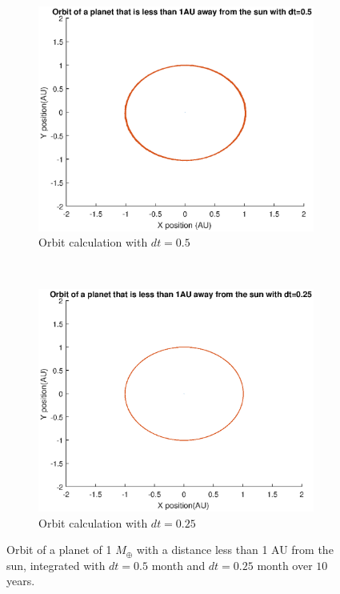 \begin{figure}[H]
	\centering
	\begin{subfigure}{0.45\textwidth}
	\includegraphics[width=\textwidth]{Planeet_1AU_dt05_10jaar.eps}
	\caption{Orbit calculation with $dt=0.5$}
	\end{subfigure}
	~
	\begin{subfigure}{0.45\textwidth}
	\includegraphics[width=\textwidth]{Planeet_1AU_dt025_10jaar.eps}
	\caption{Orbit calculation with $dt=0.25$}
	\end{subfigure}
	\caption{Orbit of a planet of 1 $M_{\oplus}$ with a distance less than 1 AU from the sun, integrated with $dt=0.5$ month and $dt=0.25$ month over $10$ years.}
\end{figure} 
